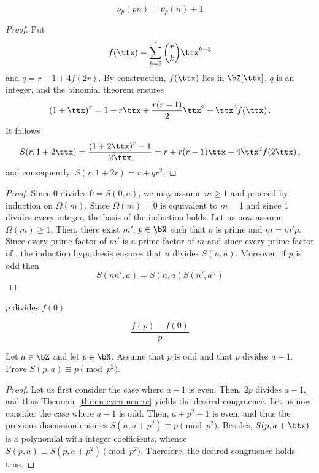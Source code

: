 $$
\nu_p(p n ) = \nu_p(n) + 1
$$
 \begin{proof}
   Put
   $$
   f(\ttx) = \sum_{k = 3}^r \binom{r}{k} \ttx^{k - 3}
   $$
   and $q =  r - 1  +  4 f(2r)$.
   By construction, $f(\ttx)$ lies in $\bZ[\ttx]$, $q$ is an integer, and the binomial theorem ensures 
   $$
   {(1 + \ttx)}^r = 1 + r \ttx + \frac{r(r - 1)}{2} \ttx^2 + \ttx^3 f(\ttx)  \, .
   $$
   It follows
   $$
   S(r, 1 + 2 \ttx) = \frac{{(1 + 2 \ttx)}^r - 1}{2 \ttx} = r + r(r - 1) \ttx + 4 \ttx^2 f(2 \ttx) \,,
   $$
   and consequently, $S(r, 1 + 2r) = r + q r^2$.
 \end{proof}

\begin{proof}
  Since $0$ divides $0 = S(0, a)$,  we may assume $m \ge 1$ and proceed by induction on $\Omega(m)$.
  Since  $\Omega(m) = 0$ is equivalent to $m = 1$ and since $1$ divides every integer,
  the basis of the induction holds.
  Let us now assume  $\Omega(m) \ge 1$.
  Then, there exist $m'$, $p \in \bN$  such that  $p$ is prime and $m = m' p$.
  Since every prime factor of $m'$ is a prime factor of $m$ and since every prime factor of , the induction hypothesis ensures that $n$ divides $S(n, a)$.
  Moreover, if $p$ is odd then 
  $$
  S(n n', a) = S(n, a) S(n', a^n)
  $$
\end{proof}


$p$ divides $f(0)$

$$
\frac{f(p) - f(0)}{p}
$$


 \begin{exercise}  \label{exo:n-odd-carre}
   Let $a \in \bZ$ and let $p \in \bN$.
   Assume that $p$ is odd and that $p$ divides $a  - 1$.
   Prove $S(p, a) \equiv p \pmod {p^2}$.
 \end{exercise}
 
 \begin{proof}
   Let us first consider the case where $a - 1$ is even.
   Then, $2p$ divides $a - 1$, and thus Theorem~\ref{thm:n-even-ncarre} yields the desired congruence.
   Let us now consider the case where $a - 1$ is odd.
   Then, $a + p^2 - 1$ is even, and thus the previous discussion ensures $S(n, a + p^2) \equiv p \pmod {p^2}$.
   Besides, $S(p, a + \ttx)$ is a polynomial with integer coefficients,
   whence $S(p, a) \equiv S(p, a + p^2) \pmod{p^2}$.
   Therefore, the desired congruence  holds true.
 \end{proof}
 

